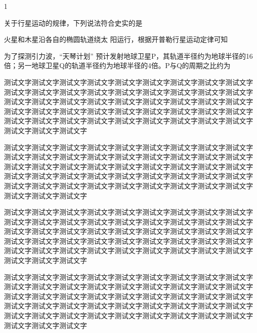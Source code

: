 \begin{Project}
\Improve[副标题]
\begin{QuestionItem}[2]{1}
	\item 关于行星运动的规律，下列说法符合史实的是
	\item 火星和木星沿各自的椭圆轨道绕太 阳运行，根据开普勒行星运动定律可知
	\item 为了探测引力波，“天琴计划” 预计发射地球卫星P，其轨道半径约为地球半径的16倍；另一地球卫星Q的轨道半径约为地球半径的4倍。P与Q的周期之比约为
	\item 测试文字测试文字测试文字测试文字测试文字测试文字测试文字测试文字测试文字测试文字测试文字测试文字测试文字测试文字测试文字测试文字测试文字测试文字测试文字测试文字测试文字测试文字测试文字测试文字测试文字测试文字测试文字测试文字测试文字测试文字测试文字测试文字测试文字测试文字测试文字测试文字测试文字测试文字测试文字测试文字测试文字测试文字测试文字测试文字测试文字测试文字测试文字测试文字
	\item 测试文字测试文字测试文字测试文字测试文字测试文字测试文字测试文字测试文字测试文字测试文字测试文字测试文字测试文字测试文字测试文字测试文字测试文字测试文字测试文字测试文字测试文字测试文字测试文字测试文字测试文字测试文字测试文字测试文字测试文字测试文字测试文字测试文字测试文字测试文字测试文字测试文字测试文字测试文字测试文字测试文字测试文字测试文字测试文字测试文字测试文字测试文字测试文字
	\item 测试文字测试文字测试文字测试文字测试文字测试文字测试文字测试文字测试文字测试文字测试文字测试文字测试文字测试文字测试文字测试文字测试文字测试文字测试文字测试文字测试文字测试文字测试文字测试文字测试文字测试文字测试文字测试文字测试文字测试文字测试文字测试文字测试文字测试文字测试文字测试文字测试文字测试文字测试文字测试文字测试文字测试文字测试文字测试文字测试文字测试文字测试文字测试文字
	\item 测试文字测试文字测试文字测试文字测试文字测试文字测试文字测试文字测试文字测试文字测试文字测试文字测试文字测试文字测试文字测试文字测试文字测试文字测试文字测试文字测试文字测试文字测试文字测试文字测试文字测试文字测试文字测试文字测试文字测试文字测试文字测试文字测试文字测试文字测试文字测试文字测试文字测试文字测试文字测试文字测试文字测试文字测试文字测试文字测试文字测试文字测试文字测试文字

\end{QuestionItem}
\end{Project}
